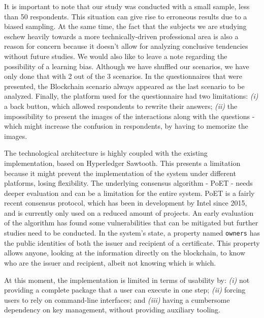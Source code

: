 It is important to note that our study was conducted with a small sample, less than 50 respondents. This situation can give rise to erroneous results due to a biased sampling. At the same time, the fact that the subjects we are studying eschew heavily towards a more technically-driven professional area is also a reason for concern because it doesn't allow for analyzing conclusive tendencies without future studies. We would also like to leave a note regarding the possibility of a learning bias. Although we have shuffled our scenarios, we have only done that with 2 out of the 3 scenarios. In the questionnaires that were presented, the Blockchain scenario always appeared as the last scenario to be analyzed. Finally, the platform used for the questionnaire had two limitations: \textit{(i)} a back button, which allowed respondents to rewrite their answers; \textit{(ii)} the impossibility to present the images of the interactions along with the questions - which might increase the confusion in respondents, by having to memorize the images.

The technological architecture is highly coupled with the existing implementation, based on Hyperledger Sawtooth. This presents a limitation because it might prevent the implementation of the system under different platforms, losing flexibility. The underlying consensus algorithm - PoET - needs deeper evaluation and can be a limitation for the entire system. PoET is a fairly recent consensus protocol, which has been in development by Intel since 2015, and is currently only used on a reduced amount of projects. An early evaluation of the algorithm has found some vulnerabilities that can be mitigated \cite{chen_security_2017} but further studies need to be conducted. In the system's state, a property named \texttt{owners} has the public identities of both the issuer and recipient of a certificate. This property allows anyone, looking at the information directly on the blockchain, to know who are the issuer and recipient, albeit not knowing which is which.

At this moment, the implementation is limited in terms of usability by: \emph{(i)} not providing a complete package that a user can execute in one step; \emph{(ii)} forcing users to rely on command-line interfaces; and \emph{(iii)} having a cumbersome dependency on key management, without providing auxiliary tooling.